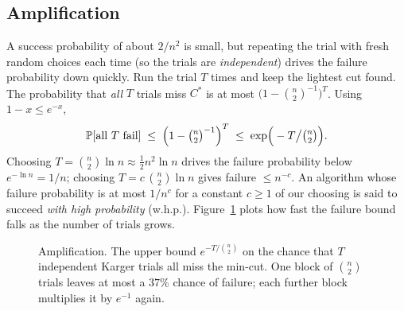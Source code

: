 \subsection{Amplification}

A success probability of about $2/n^2$ is small, but repeating the trial with fresh random choices each time (so the trials are \emph{independent}) drives the failure probability down quickly. Run the trial $T$ times and keep the lightest cut found. The probability that \emph{all} $T$ trials miss $C^\ast$ is at most $\big(1-\binom{n}{2}^{-1}\big)^T$. Using $1-x\le e^{-x}$,
\[
  \Pr[\text{all }T\text{ fail}] \;\le\; \Big(1-\tbinom{n}{2}^{-1}\Big)^{T}
  \;\le\; \exp\!\Big(-T\big/\tbinom{n}{2}\Big).
\]
Choosing $T = \binom{n}{2}\ln n \approx \tfrac12 n^2\ln n$ drives the failure probability below $e^{-\ln n}=1/n$; choosing $T=c\,\binom{n}{2}\ln n$ gives failure $\le n^{-c}$. An algorithm whose failure probability is at most $1/n^c$ for a constant $c\ge 1$ of our choosing is said to succeed \emph{with high probability} (w.h.p.). Figure~\ref{ch11:fig-amplify} plots how fast the failure bound falls as the number of trials grows.

\begin{figure}[htbp]
\centering
{}
\caption{Amplification. The upper bound $e^{-T/\binom{n}{2}}$ on the chance that $T$ independent Karger trials all miss the min-cut. One block of $\binom{n}{2}$ trials leaves at most a $37\%$ chance of failure; each further block multiplies it by $e^{-1}$ again.}
\label{ch11:fig-amplify}
\end{figure}


